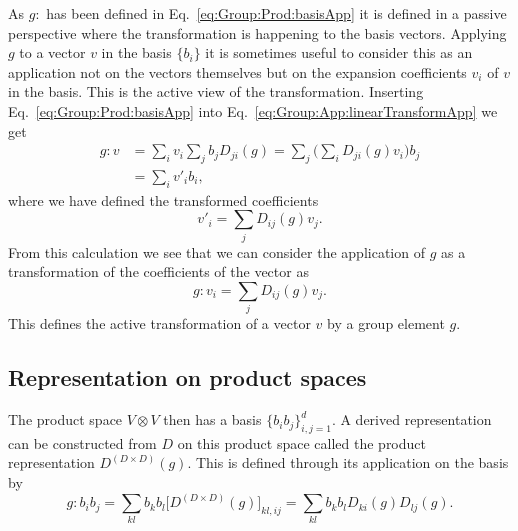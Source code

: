 As $g:$ has been defined in Eq.~\eqref{eq:Group:Prod:basisApp} it is defined in a passive perspective where the transformation is happening
to the basis vectors. Applying $g$ to a vector $v$ in the basis $\{b_i\}$ it is sometimes useful to consider this as an application not
on the vectors themselves but on the expansion coefficients $v_i$ of $v$ in the basis. This is the active view of the transformation.
Inserting Eq.~\eqref{eq:Group:Prod:basisApp} into Eq.~\eqref{eq:Group:App:linearTransformApp} we get
\begin{equation}
    \label{eq:Group:App:activeTransform}
    \begin{split}
        g:v &= \sum_iv_i\sum_jb_jD_{ji}(g) = \sum_j\Big(\sum_iD_{ji}(g)v_i\Big)b_j\\
        &= \sum_iv'_ib_i,
    \end{split}
\end{equation}
where we have defined the transformed coefficients
\begin{equation}
    \label{eq:Group:App:transformedCoeff}
    v'_i = \sum_jD_{ij}(g)v_j.
\end{equation}
From this calculation we see that we can consider the application of $g$ as a transformation of the coefficients of the vector as
\begin{equation}
    \label{eq:Group:App:coeffTransformation}
    g:v_i = \sum_jD_{ij}(g)v_j.
\end{equation}
This defines the active transformation of a vector $v$ by a group element $g$.

\subsection{Representation on product spaces}

The product space $V\otimes V$ then has a basis $\{b_ib_j\}_{i,j=1}^d$. A derived representation can be constructed from $D$ on this product space
called the product representation $D^{(D\times D)}(g)$. This is defined through its application on the basis by
\begin{equation}
    \label{eq:Group:Prod:prodBasisApp}
    g:b_ib_j = \sum_{kl}b_kb_l\big[D^{(D\times D)}(g)\big]_{kl,ij} = \sum_{kl}b_kb_lD_{ki}(g)D_{lj}(g).
\end{equation}

